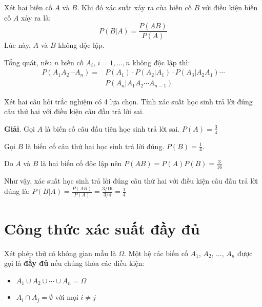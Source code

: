 \begin{theorem}
    Xét hai biến cố $A$ và $B$. Khi đó xác suất xảy ra của biến cố $B$ với điều kiện biến cố $A$ xảy ra là: 
    \begin{equation}
        P(B | A) = \frac{P(AB)}{P(A)}
    \end{equation}
    Lúc này, $A$ và $B$ không độc lập.
\end{theorem}

Tổng quát, nếu $n$ biến cố $A_i$, $i=1, \ldots, n$ không độc lập thì:
\begin{align*}
    P(A_1 A_2 \cdots A_n) = & P(A_1) \cdot P(A_2|A_1) \cdot P(A_3 | A_2A_1) \cdots \\ & P(A_n|A_1A_2 \cdots A_{n-1})
\end{align*}

\begin{example}
    Xét hai câu hỏi trắc nghiệm có 4 lựa chọn. Tính xác suất học sinh trả lời đúng câu thứ hai với điều kiện câu đầu trả lời sai.
    
    \textbf{Giải}. Gọi $A$ là biến cố câu đầu tiên học sinh trả lời sai. $P(A) = \frac{3}{4}$
    
    Gọi $B$ là biến cố câu thứ hai học sinh trả lời đúng. $P(B) = \frac{1}{4}$.
    
    Do $A$ và $B$ là hai biến cố độc lập nên $P(AB) = P(A) P(B) = \frac{3}{16}$
    
    Như vậy, xác suất học sinh trả lời đúng câu thứ hai với điều kiện câu đầu trả lời đúng là: $P(B | A) = \frac{P(AB)}{P(A)} = \frac{3 / 16}{3 / 4} = \frac{1}{4}$
\end{example}

\section{Công thức xác suất đầy đủ}

\begin{definition}
    Xét phép thử có không gian mẫu là $\Omega$. Một hệ các biến cố $A_1$, $A_2$, ..., $A_n$ được gọi là \textbf{đầy đủ} nếu chúng thỏa các điều kiện:
    \begin{itemize}
        \item $A_1 \cup A_2 \cup \cdots \cup A_n = \Omega$
        \item $A_i \cap A_j = \emptyset$ với mọi $i \neq j$
    \end{itemize}
\end{definition}
    
